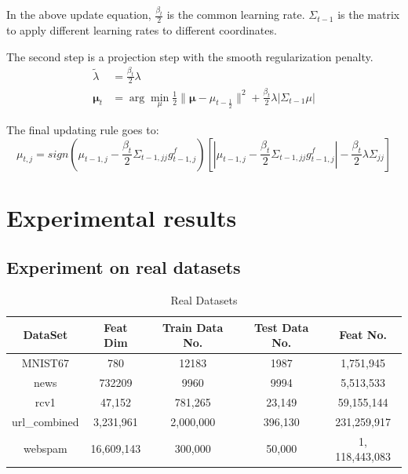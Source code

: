 \documentclass{article}
\begin{document}
In the above update equation, $\frac{\beta_t}{2}$ is the common learning rate.
$\Sigma_{t-1}$ is the matrix to apply different learning rates to different
coordinates.

The second step is a projection step with the smooth regularization penalty.
\begin{equation}
    \begin{aligned}
        \tilde{\lambda} &= \frac{\beta_t}{2} \lambda \\
        \bm{\mu}_{t} &= \arg\min_{\mu}{\frac{1}{2}\|\bm{\mu} -
        \mu_{t-\frac{1}{2}}\|^2
        + \frac{\beta_t}{2}\lambda|\Sigma_{t-1}\mu|}
    \end{aligned}
    \label{equ:08}
\end{equation}


The final updating rule goes to:
\begin{equation}
    \mu_{t,j} = sign(\mu_{t-1,j} -
    \frac{\beta_t}{2}\Sigma_{t-1,jj}g_{t-1,j}^f)
    [|\mu_{t-1,j} - \frac{\beta_t}{2}\Sigma_{t-1,jj}g_{t-1,j}^f| -
    \frac{\beta_t}{2}\lambda\Sigma_{jj}]
    \label{equ:09}
\end{equation}

\section{Experimental results}
\subsection{Experiment on real datasets}

\begin{table}[!ht]
\renewcommand{\arraystretch}{1.3}
\caption{Real Datasets}
\label{tbl:01}
\centering
\begin{tabular}{|c|c|c|c|c|}
\hline
DataSet& Feat Dim & Train Data No. & Test Data No. & Feat No.\\
\hline
MNIST67 & 780 & 12183 & 1987 & 1,751,945\\
\hline
news & 732209 & 9960 & 9994 & 5,513,533\\
\hline
rcv1& 47,152  & 781,265 & 23,149 &59,155,144\\
\hline
url\_combined & 3,231,961 & 2,000,000 & 396,130 &231,259,917\\
\hline
webspam& 16,609,143 &300,000 & 50,000 &1, 118,443,083\\
\hline
\end{tabular}
\end{table}
\end{document}
